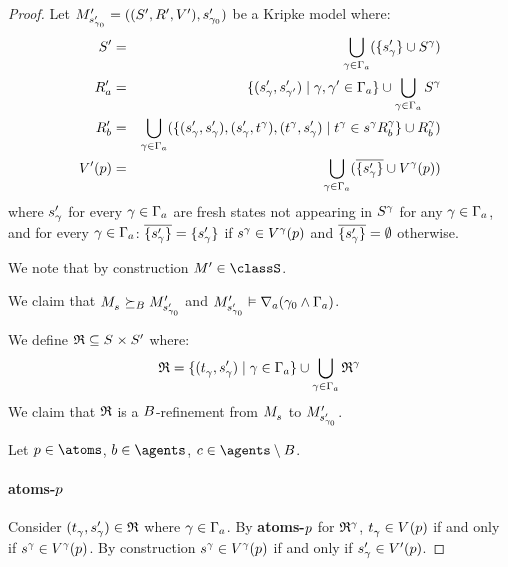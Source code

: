 \begin{proof}
Let $\kPModelAndTupleP{\kStateSP_{\gamma_0}}$ be a Kripke model where:
\begin{eqnarray*}
    \kStatesP &=& \bigcup_{\gamma \in \Gamma_\agentA} (\{\kStateSP_\gamma\} \cup \kStates[\gamma])\\
    \kAccessibilityPA &=& \{(\kStateSP_\gamma, \kStateSP_{\gamma'}) \mid \gamma, \gamma' \in \Gamma_\agentA\} \cup \bigcup_{\gamma \in \Gamma_\agentA} \kStates[\gamma]\\
    \kAccessibilityPB &=& \bigcup_{\gamma \in \Gamma_\agentA} (\{(\kStateSP_\gamma, \kStateSP_\gamma), (\kStateSP_\gamma, \kStateT[\gamma]), (\kStateT[\gamma], \kStateSP_\gamma) \mid \kStateT[\gamma] \in \kSuccessorsB[\gamma]{\kStateS[\gamma]}\} \cup \kAccessibilityB[\gamma])\\
    \kValuationP(\atomP) &=& \bigcup_{\gamma \in \Gamma_\agentA} (\overline{\{\kStateSP_\gamma\}} \cup \kValuation[\gamma](\atomP))
\end{eqnarray*}
where $\kStateSP_\gamma$ for every $\gamma \in \Gamma_\agentA$ are fresh states not appearing in $\kStates[\gamma]$ for any $\gamma \in \Gamma_\agentA$, and for every $\gamma \in \Gamma_\agentA$: $\overline{\{\kStateSP_\gamma\}} = \{\kStateSP_\gamma\}$ if $\kStateS[\gamma] \in \kValuation[\gamma](\atomP)$ and $\overline{\{\kStateSP_\gamma\}} = \emptyset$ otherwise.

We note that by construction $\kModelP \in \classS$.

We claim that $\kPModel{\kStateS} \simulatesBs \kPModelP{\kStateSP_{\gamma_0}}$ and $\kPModelP{\kStateSP_{\gamma_0}} \entails \coversA (\gamma_0 \land \Gamma_\agentA)$.

We define $\refinement \subseteq \kStates \times \kStatesP$ where:
$$
\refinement = \{(\kStateT_\gamma, \kStateSP_\gamma) \mid \gamma \in \Gamma_\agentA\} \cup \bigcup_{\gamma \in \Gamma_\agentA} \refinement^\gamma
$$
We claim that $\refinement$ is a $\agentsB$-refinement from $\kPModel{\kStateS}$ to $\kPModelP{\kStateSP_{\gamma_0}}$.

Let $\atomP \in \atoms$, $\agentB \in \agents$, $\agentC \in \agents \setminus \agentsB$.

\paragraph{atoms-$\atomP$}
Consider $(\kStateT_\gamma, \kStateSP_\gamma) \in \refinement$ where $\gamma \in \Gamma_\agentA$.
By {\bf atoms-$\atomP$} for $\refinement^\gamma$, $\kStateT_\gamma \in \kValuation(\atomP)$ if and only if $\kStateS[\gamma] \in \kValuation[\gamma](\atomP)$.
By construction $\kStateS[\gamma] \in \kValuation[\gamma](\atomP)$ if and only if $\kStateSP_\gamma \in \kValuationP(\atomP)$.


\end{proof}
